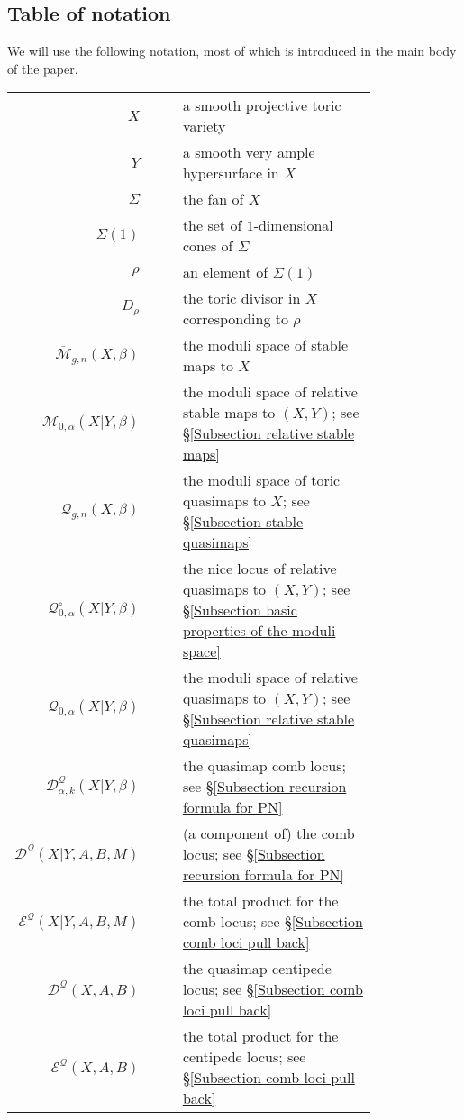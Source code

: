 \documentclass[11pt]{amsart}
\newcommand{\M}[4]{\overline{\mathcal{M}}_{#1,#2}(#3,#4)}
\newcommand{\Q}[4]{\mathcal{Q}_{#1,#2}(#3,#4)}
\theoremstyle{definition}
\theoremstyle{definition}
\begin{document}
\subsection{Table of notation} We will use the following notation, most of which is introduced in the main body of the paper.
\begin{longtabu}{r c c p{0.8\linewidth}}
$X$ & & & a smooth projective toric variety \\
$Y$ & & & a smooth very ample hypersurface in $X$ \\
$\Sigma$ & & & the fan of $X$ \\
$\Sigma(1)$ & & & the set of $1$-dimensional cones of $\Sigma$ \\
$\rho$ & & & an element of $\Sigma(1)$ \\
$D_\rho$ & & & the toric divisor in $X$ corresponding to $\rho$ \\
$\M{g}{n}{X}{\beta}$ & & & the moduli space of stable maps to $X$ \\
$\M{0}{\alpha}{X|Y}{\beta}$ & & & the moduli space of relative stable maps to $(X,Y)$; see \S \ref{Subsection relative stable maps} \\
$\Q{g}{n}{X}{\beta}$ & & & the moduli space of toric quasimaps to $X$; see \S \ref{Subsection stable quasimaps} \\
$\mathcal{Q}^{\circ}_{0,\alpha}(X|Y,\beta)$ & & & the nice locus of relative quasimaps to $(X,Y)$; see \S \ref{Subsection basic properties of the moduli space} \\
$\Q{0}{\alpha}{X|Y}{\beta}$ & & & the moduli space of relative quasimaps to $(X,Y)$; see \S \ref{Subsection relative stable quasimaps} \\
$\mathcal{D}^{\mathcal{Q}}_{\alpha,k}(X|Y,\beta)$ & & & the quasimap comb locus; see \S \ref{Subsection recursion formula for PN} \\
$\mathcal{D}^{\mathcal{Q}}(X|Y,A,B,M)$ & & & (a component of) the comb locus; see \S \ref{Subsection recursion formula for PN} \\
$\mathcal{E}^{\mathcal{Q}}(X|Y,A,B,M)$ & & & the total product for the comb locus; see \S \ref{Subsection comb loci pull back} \\
$\mathcal{D}^{\mathcal{Q}}(X,A,B)$ & & & the quasimap centipede locus; see \S \ref{Subsection comb loci pull back} \\
$\mathcal{E}^{\mathcal{Q}}(X,A,B)$ & & & the total product for the centipede locus; see \S \ref{Subsection comb loci pull back} \\

\end{longtabu}
\end{document}
